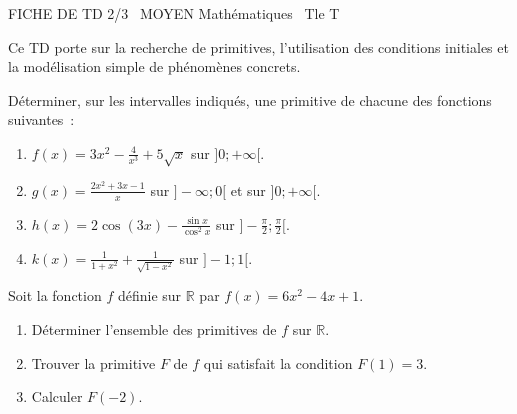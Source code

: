 \documentclass[11pt]{article}
\begin{document}
\begin{tcolorbox}[enhanced,colback=popink,colframe=popink,arc=10pt,boxrule=0pt,left=12pt,right=12pt,top=9pt,bottom=9pt]
{\color{white}\popxbold\small FICHE DE TD 2/3 \textbullet\ MOYEN \hfill Mathématiques \textbullet\ Tle T\par}
\end{tcolorbox}
\vspace{4pt}
Ce TD porte sur la recherche de primitives, l'utilisation des conditions initiales et la modélisation simple de phénomènes concrets.

\begin{exercice}
Déterminer, sur les intervalles indiqués, une primitive de chacune des fonctions suivantes~:
\begin{enumerate}
    \item $f(x) = 3x^2 - \frac{4}{x^3} + 5\sqrt{x}$ sur $]0; +\infty[$.
    \item $g(x) = \frac{2x^2 + 3x - 1}{x}$ sur $]-\infty; 0[$ et sur $]0; +\infty[$.
    \item $h(x) = 2\cos(3x) - \frac{\sin x}{\cos^2 x}$ sur $]-\frac{\pi}{2}; \frac{\pi}{2}[$.
    \item $k(x) = \frac{1}{1+x^2} + \frac{1}{\sqrt{1-x^2}}$ sur $]-1; 1[$.
\end{enumerate}
\end{exercice}

\begin{exercice}
Soit la fonction $f$ définie sur $\mathbb{R}$ par $f(x) = 6x^2 - 4x + 1$.
\begin{enumerate}
    \item Déterminer l'ensemble des primitives de $f$ sur $\mathbb{R}$.
    \item Trouver la primitive $F$ de $f$ qui satisfait la condition $F(1) = 3$.
    \item Calculer $F(-2)$.
\end{enumerate}
\end{exercice}
\end{document}
